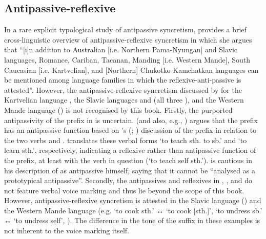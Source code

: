 \subsection{Antipassive-reflexive} \label{sec:simple-syncretism:antp-refl}
In a rare explicit typological study of antipassive syncretism, \cite[158]{janic:2010} provides a brief cross-linguistic overview of antipassive-reflexive syncretism in which she argues that “[i]n addition to Australian [i.e. Northern Pama-Nyungan] and Slavic languages, Romance, Ca\-ri\-ban, Tacanan, Manding [i.e. Western Mande], South Caucasian [i.e. Kartvelian], and [Northern] Chukotko-Kamchatkan languages can be mentioned among language families in which the re\-flex\-ive-anti-passive  is attested”. However, the antipassive-reflexive syncretism discussed by \citeauthor{janic:2010} for the Kartvelian language , the Slavic languages  and  (all three ), and the Western Mande language  () is not recognised by this book. Firstly, the purported antipassivity of the prefix  in  is uncertain. \citeauthor{janic:2010} (and also, e.g., \citealt[193]{sanso:2017}) argues that the prefix has an antipassive function based on \citeauthor{lacroix:2009}’s (\citeyear[467]{lacroix:2009}; \citeyear[181f.]{lacroix:2012}) discussion of the prefix in relation to the two verbs  and . \citeauthor{lacroix:2009} translates these verbal forms ‘to teach sth. to sb.’ and ‘to learn sth.’, respectively, indicating a reflexive rather than antipassive function of the prefix, at least with the verb in question (‘to teach self sth.’). \cite[181]{lacroix:2012} is cautious in his description of  as antipassive himself, saying that it cannot be “analysed as a prototypical antipassive”. Secondly, the antipassives and reflexives in , , and  do not feature verbal voice marking and thus lie beyond the scope of this book. However, antipassive-reflexive syncretism is attested in the Slavic language  () and the Western Mande language  (e.g.  ‘to cook sth.’ ↔  ‘to cook [sth.]’,  ‘to undress sb.’ ↔  ‘to undress self’, \citealt[10]{creissels:2012}). The difference in the tone of the suffix  in these examples is not inherent to the voice marking itself. 

